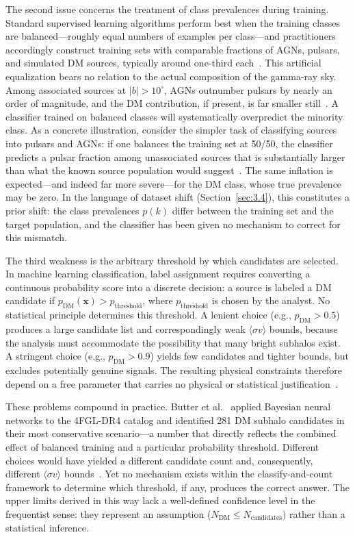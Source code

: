 The second issue concerns the treatment of class prevalences during training.
Standard supervised learning algorithms perform best when the training classes are balanced---roughly equal numbers of examples per class---and practitioners accordingly construct training sets with comparable fractions of AGNs, pulsars, and simulated DM sources, typically around one-third each~\cite{Amerio:2025fhz}.
This artificial equalization bears no relation to the actual composition of the gamma-ray sky.
Among associated sources at $|b| > 10^\circ$, AGNs outnumber pulsars by nearly an order of magnitude, and the DM contribution, if present, is far smaller still~\cite{Amerio:2025fhz}.
A classifier trained on balanced classes will systematically overpredict the minority class.
As a concrete illustration, consider the simpler task of classifying sources into pulsars and AGNs: if one balances the training set at 50/50, the classifier predicts a pulsar fraction among unassociated sources that is substantially larger than what the known source population would suggest~\cite{Amerio:2025fhz}.
The same inflation is expected---and indeed far more severe---for the DM class, whose true prevalence may be zero.
In the language of dataset shift (Section~\ref{sec:3.4}), this constitutes a prior shift: the class prevalences $p(k)$ differ between the training set and the target population, and the classifier has been given no mechanism to correct for this mismatch.

The third weakness is the arbitrary threshold by which candidates are selected.
In machine learning classification, label assignment requires converting a continuous probability score into a discrete decision: a source is labeled a DM candidate if $p_\mathrm{DM}(\mathbf{x}) > p_\mathrm{threshold}$, where $p_\mathrm{threshold}$ is chosen by the analyst.
No statistical principle determines this threshold.
A lenient choice (e.g., $p_\mathrm{DM} > 0.5$) produces a large candidate list and correspondingly weak $\langle\sigma v\rangle$ bounds, because the analysis must accommodate the possibility that many bright subhalos exist.
A stringent choice (e.g., $p_\mathrm{DM} > 0.9$) yields few candidates and tighter bounds, but excludes potentially genuine signals.
The resulting physical constraints therefore depend on a free parameter that carries no physical or statistical justification~\cite{Amerio:2025fhz}.

These problems compound in practice.
Butter et al.~\cite{2023JCAP...07..033B} applied Bayesian neural networks to the 4FGL-DR4 catalog and identified 281 DM subhalo candidates in their most conservative scenario---a number that directly reflects the combined effect of balanced training and a particular probability threshold.
Different choices would have yielded a different candidate count and, consequently, different $\langle\sigma v\rangle$ bounds~\cite{Amerio:2025fhz}.
Yet no mechanism exists within the classify-and-count framework to determine which threshold, if any, produces the correct answer.
The upper limits derived in this way lack a well-defined confidence level in the frequentist sense: they represent an assumption ($N_\mathrm{DM} \leq N_\mathrm{candidates}$) rather than a statistical inference.

